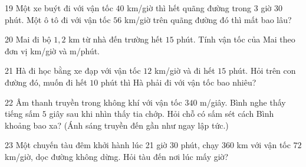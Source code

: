 \gap
\begin{probbox}{19}{\relax}
Một xe buýt đi với vận tốc $40$ km/giờ thì hết quãng đường trong $3$ giờ $30$ phút. Một ô tô đi với vận tốc $56$ km/giờ trên quãng đường đó thì mất bao lâu?
\end{probbox}
\gap
\begin{probbox}{20}{\relax}
Mai đi bộ $1{,}2$ km từ nhà đến trường hết $15$ phút. Tính vận tốc của Mai theo đơn vị km/giờ và m/phút.
\end{probbox}
\gap
\begin{probbox}{21}{\relax}
Hà đi học bằng xe đạp với vận tốc $12$ km/giờ và đi hết $15$ phút. Hỏi trên con đường đó, muốn đi hết $10$ phút thì Hà phải đi với vận tốc bao nhiêu?
\end{probbox}
\gap
\begin{probbox}{22}{\relax}
Âm thanh truyền trong không khí với vận tốc $340$ m/giây. Bình nghe thấy tiếng sấm $5$ giây sau khi nhìn thấy tia chớp. Hỏi chỗ có sấm sét cách Bình khoảng bao xa? (Ánh sáng truyền đến gần như ngay lập tức.)
\end{probbox}
\gap
\begin{probbox}{23}{\relax}
Một chuyến tàu đêm khởi hành lúc 21 giờ 30 phút, chạy $360$ km với vận tốc $72$ km/giờ, dọc đường không dừng. Hỏi tàu đến nơi lúc mấy giờ?
\end{probbox}
